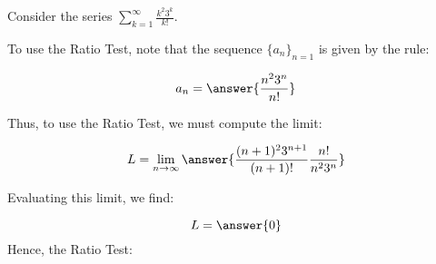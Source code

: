 \documentclass{ximera}
\author{Jim Talamo}
\begin{document}
\begin{exercise}
Consider the series $\sum_{k=1}^{\infty} \frac{k^2 3^k}{k!}$.


To use the Ratio Test, note that the sequence $\{a_n\}_{n=1}$ is given by the rule:

\[
a_n = \answer{\frac{n^2 3^n}{n!}}
\]

Thus, to use the Ratio Test, we must compute the limit:

\[
L = \lim_{n \to \infty} \answer{\frac{(n+1)^2 3^{n+1}}{(n+1)!}\frac{n!}{n^2 3^n}}
\]

Evaluating this limit, we find:

\[
L = \answer{0}
\]
Hence, the Ratio Test:
\begin{multipleChoice}
\end{multipleChoice}

\end{exercise}
\end{document}
